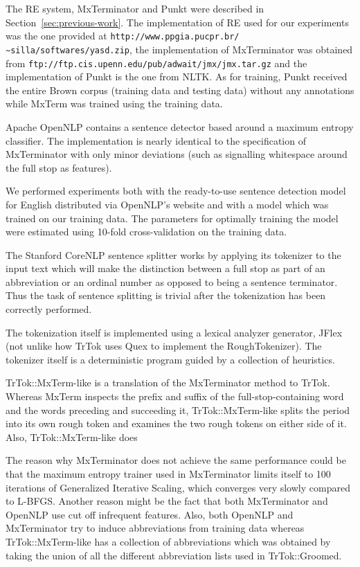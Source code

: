 The RE system, MxTerminator and Punkt were described in
Section~\ref{sec:previous-work}. The implementation of RE used for our
experiments was the one provided at
\texttt{http://www.ppgia.pucpr.br/∼silla/softwares/yasd.zip}, the
implementation of MxTerminator was obtained from
\texttt{ftp://ftp.cis.upenn.edu/pub/adwait/jmx/jmx.tar.gz} and the
implementation of Punkt is the one from NLTK. As for training, Punkt
received the entire Brown corpus (training data and testing data)
without any annotations while MxTerm was trained using the training
data.

Apache OpenNLP contains a sentence detector based around a maximum
entropy classifier. The implementation is nearly identical to the
specification of MxTerminator with only minor deviations (such as
signalling whitespace around the full stop as features).

We performed experiments both with the ready-to-use sentence detection
model for English distributed via OpenNLP's website and with a model
which was trained on our training data. The parameters for optimally
training the model were estimated using 10-fold cross-validation on
the training data.

The Stanford CoreNLP sentence splitter works by applying its tokenizer
to the input text which will make the distinction between a full stop
as part of an abbreviation or an ordinal number as opposed to being a
sentence terminator. Thus the task of sentence splitting is trivial
after the tokenization has been correctly performed.

The tokenization itself is implemented using a lexical analyzer
generator, JFlex (not unlike how TrTok uses Quex to implement the
RoughTokenizer). The tokenizer itself is a deterministic program
guided by a collection of heuristics.

TrTok::MxTerm-like is a translation of the MxTerminator method to
TrTok. Whereas MxTerm inspects the prefix and suffix of the
full-stop-containing word and the words preceding and succeeding it,
TrTok::MxTerm-like splits the period into its own rough token and
examines the two rough tokens on either side of it. Also,
TrTok::MxTerm-like does

The reason why MxTerminator does not achieve the same performance
could be that the maximum entropy trainer used in MxTerminator limits
itself to 100 iterations of Generalized Iterative Scaling, which
converges very slowly compared to L-BFGS. Another reason might be the
fact that both MxTerminator and OpenNLP use cut off infrequent
features. Also, both OpenNLP and MxTerminator try to induce
abbreviations from training data whereas TrTok::MxTerm-like has a
collection of abbreviations which was obtained by taking the union of
all the different abbreviation lists used in TrTok::Groomed.

